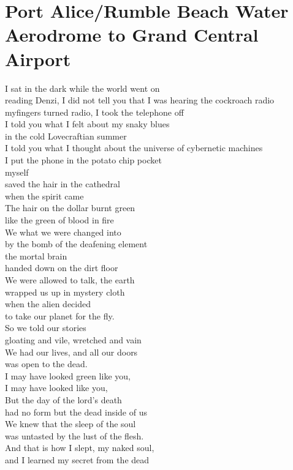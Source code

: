 \documentclass[smalldemyvopaper,11pt,twoside,onecolumn,openright,extrafontsizes]{memoir}
\begin{document}
\chapter{Port Alice/Rumble Beach Water Aerodrome to Grand Central Airport}
I sat in the dark while the world went on
\\reading Denzi, I did not tell you that I was hearing the cockroach radio
\\myfingers turned radio, I took the telephone off
\\I told you what I felt about my snaky blues
\\in the cold Lovecraftian summer
\\I told you what I thought about the universe of cybernetic machines
\\I put the phone in the potato chip pocket
\\myself
\\saved the hair in the cathedral
\\when the spirit came
\\The hair on the dollar burnt green
\\like the green of blood in fire
\\We what we were changed into
\\by the bomb of the deafening element
\\the mortal brain
\\handed down on the dirt floor
\\We were allowed to talk, the earth
\\wrapped us up in mystery cloth
\\when the alien decided
\\to take our planet for the fly.
\\So we told our stories
\\gloating and vile, wretched and vain
\\We had our lives, and all our doors
\\was open to the dead.
\\I may have looked green like you,
\\I may have looked like you,
\\But the day of the lord's death
\\had no form but the dead inside of us
\\We knew that the sleep of the soul
\\was untasted by the lust of the flesh.
\\And that is how I slept, my naked soul,
\\and I learned my secret from the dead
\end{document}
